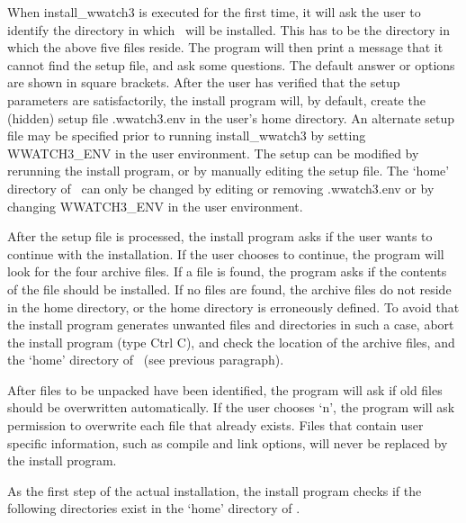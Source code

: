 When {\file install\_wwatch3} is executed for the first time, it will ask the
user to identify the directory in which \ws\ will be installed. This has to be
the directory in which the above five files reside. The program will then
print a message that it cannot find the setup file, and ask some
questions. The default answer or options are shown in square brackets. After
the user has verified that the setup parameters are satisfactorily, the
install program will, by default, create the (hidden) setup file
{\file .wwatch3.env} in the user's home directory.
An alternate setup file may be specified prior to running {\file install\_wwatch3}
by setting {\file WWATCH3\_ENV} in the user environment.
The setup can be modified by rerunning the install
program, or by manually editing the setup file. The
`home' directory of \ws\ can only be changed by editing or removing {\file
.wwatch3.env} or by changing {\file WWATCH3\_ENV} in the user environment.

After the setup file is processed, the install program asks if the user wants
to continue with the installation. If the user chooses to continue, the
program will look for the four archive files. If a file is found, the program
asks if the contents of the file should be installed. If no files are found,
the archive files do not reside in the home directory, or the home directory
is erroneously defined. To avoid that the install program generates unwanted
files and directories in such a case, abort the install program (type Ctrl C),
and check the location of the archive files, and the `home' directory of \ws\
(see previous paragraph).

After files to be unpacked have been identified, the program will ask if old
files should be overwritten automatically. If the user chooses `n', the
program will ask permission to overwrite each file that already exists. Files
that contain user specific information, such as compile and link options, will
never be replaced by the install program.

As the first step of the actual installation, the install program checks if the following directories exist in the `home' directory of \ws.
 
\begin{dlist}
\dit{exe }{\ws\ executables.}
\end{dlist}

